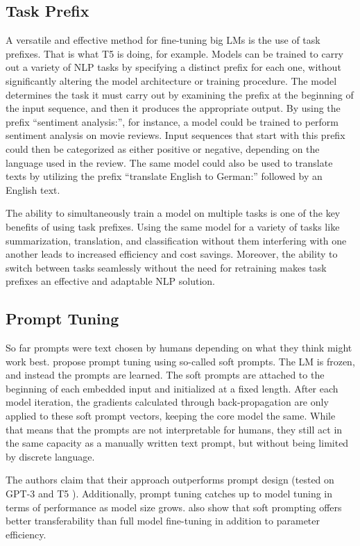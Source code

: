 \subsection{Task Prefix} \label{task_prefix}

A versatile and effective method for fine-tuning big LMs is the use of task prefixes. That is what T5 \citep{raffel2020exploring} is doing, for example. Models can be trained to carry out a variety of NLP tasks by specifying a distinct prefix for each one, without significantly altering the model architecture or training procedure. The model determines the task it must carry out by examining the prefix at the beginning of the input sequence, and then it produces the appropriate output. By using the prefix ``sentiment analysis:'', for instance, a model could be trained to perform sentiment analysis on movie reviews. Input sequences that start with this prefix could then be categorized as either positive or negative, depending on the language used in the review. The same model could also be used to translate texts by utilizing the prefix ``translate English to German:'' followed by an English text.

The ability to simultaneously train a model on multiple tasks is one of the key benefits of using task prefixes. Using the same model for a variety of tasks like summarization, translation, and classification without them interfering with one another leads to increased efficiency and cost savings. Moreover, the ability to switch between tasks seamlessly without the need for retraining makes task prefixes an effective and adaptable NLP solution.


\subsection{Prompt Tuning}

So far prompts were text chosen by humans depending on what they think might work best. \citet{lester2021power} propose prompt tuning using so-called soft prompts. The LM is frozen, and instead the prompts are learned. The soft prompts are attached to the beginning of each embedded input and initialized at a fixed length. After each model iteration, the gradients calculated through back-propagation are only applied to these soft prompt vectors, keeping the core model the same. While that means that the prompts are not interpretable for humans, they still act in the same capacity as a manually written text prompt, but without being limited by discrete language.

The authors claim that their approach outperforms prompt design (tested on GPT-3 \citep{brown2020gpt3} and T5 \citep{raffel2020exploring}). Additionally, prompt tuning catches up to model tuning in terms of performance as model size grows. \citet{lester2021power} also show that soft prompting offers better transferability than full model fine-tuning in addition to parameter efficiency.

